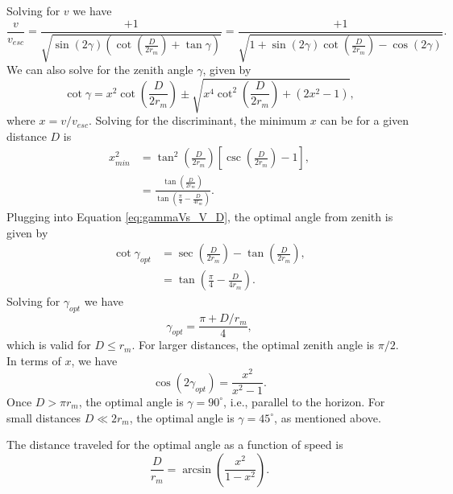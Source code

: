 \documentclass{hitec}
\numberwithin{equation}{section}
\begin{document}
Solving for $v$ we have
\begin{equation}\label{eq:speed_asof_distance_angle}
\frac{v}{v_{esc}} = \frac{+1}{\sqrt{\sin(2\gamma)\left(\cot\left(\frac{D}{2r_m}\right)+\tan\gamma\right)}}
= \frac{+1}{\sqrt{1+\sin(2\gamma)\cot\left(\frac{D}{2r_m}\right)-\cos(2\gamma)}}.
\end{equation}
We can also solve for the zenith angle $\gamma$, given by
\begin{equation}\label{eq:gammaVs_V_D}
\cot\gamma = x^2\cot\left(\frac{D}{2r_m}\right) \pm \sqrt{x^4\cot^2\left(\frac{D}{2r_m}\right) + (2x^2-1)},
\end{equation}
where $x = v/v_{esc}$. Solving for the discriminant, the minimum $x$ can be for a given distance $D$ is
\begin{align}
x_{min}^2 &= \tan^2\left(\frac{D}{2r_m}\right)\left[\csc\left(\frac{D}{2r_m}\right)-1\right],\\\label{eq:v_min_tans}
&=\frac{\tan\left(\frac{D}{2r_m}\right)}{\tan\left(\frac{\pi}{4}-\frac{D}{4r_m}\right)}.
\end{align}
Plugging into Equation \ref{eq:gammaVs_V_D}, the optimal angle from zenith is given by
\begin{align}\label{eq:opt_angle}
\cot\gamma_{opt} &= \sec\left(\frac{D}{2r_m}\right) - \tan\left(\frac{D}{2r_m}\right),\\\nonumber
&=\tan\left(\frac{\pi}{4}-\frac{D}{4r_m}\right).
\end{align}
Solving for $\gamma_{opt}$ we have
\begin{equation}
\gamma_{opt} = \frac{\pi+D/r_m}{4},
\end{equation}
which is valid for $D \le r_m$. For larger distances, the optimal zenith angle is $\pi/2$.
In terms of $x$, we have
\begin{equation}
\cos(2\gamma_{opt}) = \frac{x^2}{x^2-1}.
\end{equation}
Once $D > \pi r_m$, the optimal angle is $\gamma = 90^\circ$, i.e., parallel to the horizon. For small distances $D \ll 2r_m$, the optimal angle is $\gamma = 45^\circ$, as mentioned above.

The distance traveled for the optimal angle as a function of speed is
\begin{equation}
\frac{D}{r_m} = \arcsin\left(\frac{x^2}{1-x^2}\right).
\end{equation}
\end{document}
